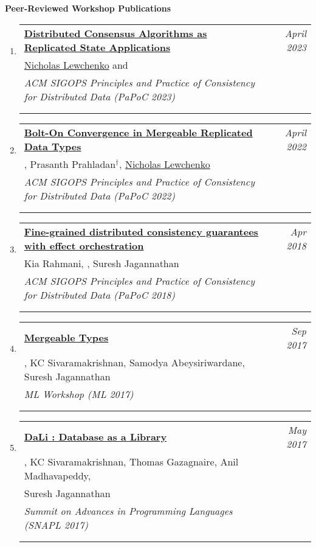 \documentclass{article}
\makeatletter
\newenvironment{benumerate}[2]{
    \let\oldItem\item
    \def\item{\addtocounter{enumi}{-2}\oldItem}
    \begin{enumerate}[#2] \itemsep3pt
    \setcounter{enumi}{#1}
    \addtocounter{enumi}{1}}
  {\end{enumerate}}
\newenvironment{region}[3]{%
  {{\textbf{#1}}}
  \begin{benumerate}{#3}{\color{RoyalBlue}#2}}
  {\end{benumerate}\vspace{0.8ex}}
\newenvironment{publication}[6]
{ \item
  \begin{tabular*}{6.8in}{p{6in}@{\extracolsep{\fill}}r}
    \href{#1}{\textbf{#2}} & \textit{#3}\\ #4 &\\ \textit{#5}&\\
    \ifthenelse{\equal{#6}{}}{}{#6&\\}
  \end{tabular*}
} {}
\makeatother
\begin{document}
\begin{region} {Peer-Reviewed Workshop Publications}{{W}1}{5}
  \begin{publication} {https://gowthamk.github.io/docs/papoc23.pdf}
		{Distributed Consensus Algorithms as Replicated State Applications }
		{April 2023} {\underline{Nicholas Lewchenko} and \ugkaki}
		{ACM SIGOPS Principles and Practice of Consistency for Distributed Data
    (PaPoC 2023)}
    {Acceptance rate: 70\%}
  \end{publication}

  \begin{publication} {https://gowthamk.github.io/docs/papoc23.pdf}
		{Bolt-On Convergence in Mergeable Replicated Data Types}
		{April 2022} {\ugkaki, Prasanth Prahladan$^\dag$, \underline{Nicholas Lewchenko}}
		{ACM SIGOPS Principles and Practice of Consistency for Distributed Data
    (PaPoC 2022)}
    {Acceptance rate: 73\%}
  \end{publication}

	\begin{publication}{https://gowthamk.github.io/docs/papoc18.pdf}
		{Fine-grained distributed consistency guarantees with effect orchestration}
		{Apr 2018}{Kia Rahmani, \ugkaki, Suresh Jagannathan}
		{ACM SIGOPS Principles and Practice of Consistency for Distributed Data (PaPoC
		2018)}
    {Acceptance rate: 72\%}
  \end{publication}

  \begin{publication}{http://kcsrk.info/papers/mergeable_types_ml17.pdf}
    {Mergeable Types}
    {Sep 2017}{\ugkaki, KC Sivaramakrishnan, Samodya Abeysiriwardane, Suresh Jagannathan}
    {ML Workshop (ML 2017)}
    {Acceptance rate unknown}
  \end{publication}

	\begin{publication} {http://kcsrk.info/papers/dali_snapl17.pdf}
    {DaLi : Database as a Library}
    {May 2017} {\ugkaki, KC Sivaramakrishnan, Thomas Gazagnaire, Anil
    Madhavapeddy, &\\ Suresh Jagannathan}
    {Summit on Advances in Programming Languages (SNAPL 2017)}
    {Oral Presentation. Acceptance rate unknown.}
  \end{publication}

\end{region}
\end{document}
